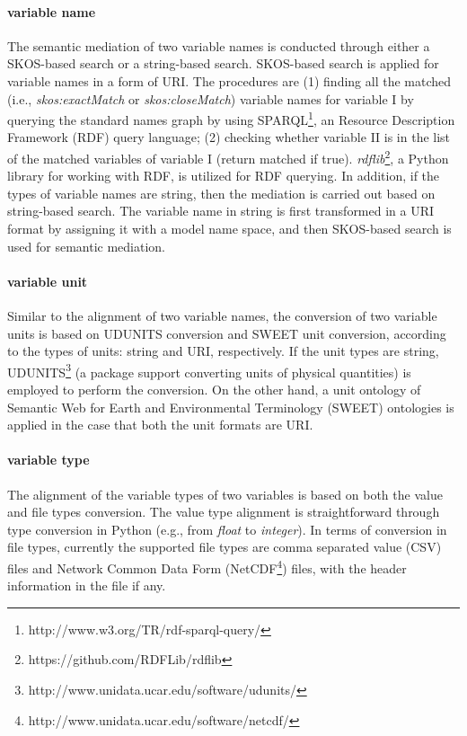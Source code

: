 \documentclass[review]{elsarticle}
\begin{document}
\paragraph{variable name} The semantic mediation of two variable names is conducted through either a SKOS-based search or a string-based search. SKOS-based search is applied for variable names in a form of URI. The procedures are (1) finding all the matched (i.e., \textit{skos:exactMatch} or \textit{skos:closeMatch}) variable names for variable I by querying the standard names graph by using SPARQL\footnote{http://www.w3.org/TR/rdf-sparql-query/}, an Resource Description Framework (RDF) query language; (2) checking whether variable II is in the list of the matched variables of variable I (return matched if true). \textit{rdflib}\footnote{https://github.com/RDFLib/rdflib}, a Python library for working with RDF, is utilized for RDF querying. In addition, if the types of variable names are string, then the mediation is carried out based on string-based search. The variable name in string is first transformed in a URI format by assigning it with a model name space, and then SKOS-based search is used for semantic mediation.

\paragraph{variable unit} Similar to the alignment of two variable names, the conversion of two variable units is based on UDUNITS conversion and SWEET unit conversion, according to the types of units: string and URI, respectively. If the unit types are string, UDUNITS\footnote{http://www.unidata.ucar.edu/software/udunits/} (a package support converting units of physical quantities) is employed to perform the conversion. On the other hand, a unit ontology of Semantic Web for Earth and Environmental Terminology (SWEET) ontologies is applied in the case that both the unit formats are URI. 

\paragraph{variable type} The alignment of the variable types of two variables is based on both the value and file types conversion. The value type alignment is straightforward through type conversion in Python (e.g., from \textit{float} to \textit{integer}). In terms of conversion in file types, currently the supported file types are comma separated value (CSV) files and Network Common Data Form (NetCDF\footnote{http://www.unidata.ucar.edu/software/netcdf/}) files, with the header information in the file if any. 
\end{document}
